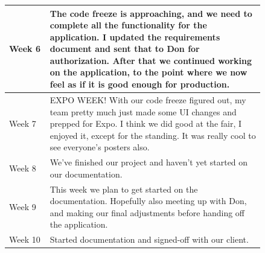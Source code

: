 \documentclass[onecolumn, draftclsnofoot,10pt, compsoc]{IEEEtran}
\begin{document}
\begin{center}
\begin{longtable}{| l | p{0.84\linewidth}|}
    Week 6 & The code freeze is approaching, and we need to complete all the functionality for the application. I updated the requirements document and sent that to Don for authorization.  After that we continued working on the application, to the point where we now feel as if it is good enough for production. \\ \hline
	Week 7 & EXPO WEEK!  With our code freeze figured out, my team pretty much just made some UI changes and prepped for Expo.  I think we did good at the fair, I enjoyed it, except for the standing.  It was really cool to see everyone's posters also. \\ \hline
	Week 8 & We've finished our project and haven't yet started on our documentation.  \\ \hline
	Week 9 & This week we plan to get started on the documentation.  Hopefully also meeting up with Don, and making our final adjustments before handing off the application. \\ \hline
    Week 10 & Started documentation and signed-off with our client. \\ \hline
\end{longtable}
\end{center}
\end{document}
